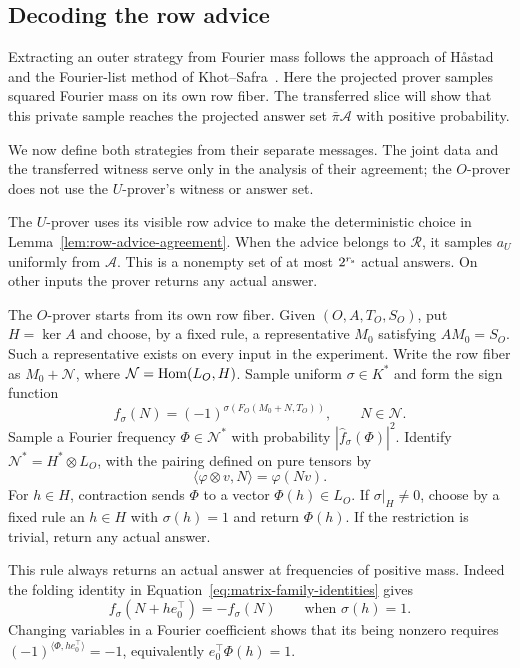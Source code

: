 \subsection{Decoding the row advice}

Extracting an outer strategy from Fourier mass follows the approach of
H\aa stad~\cite[Section~1.1]{Hastad01} and the Fourier-list method of
Khot--Safra~\cite[Section~1.1]{KS13}. Here the projected prover samples
squared Fourier mass on its own row fiber.  The transferred slice will
show that this private sample reaches the projected answer set
$\bar\pi\mathcal A$ with positive probability.

We now define both strategies from their separate messages.  The joint
data and the transferred witness serve only in the analysis of their
agreement; the $O$-prover does not use the $U$-prover's witness or answer set.

The $U$-prover uses its visible row advice to make the deterministic choice
in Lemma~\ref{lem:row-advice-agreement}.  When the advice belongs to $\mathcal R$, it samples
$a_U$ uniformly from $\mathcal A$.
This is a nonempty set of at most $2^{r_{\rm s}}$ actual answers.  On
other inputs the prover returns any actual answer.

The $O$-prover starts from its own row fiber.  Given $(O,A,T_O,S_O)$, put
$H=\ker A$ and choose, by a fixed rule, a representative $M_0$ satisfying
$AM_0=S_O$.  Such a representative exists
on every input in the experiment.  Write the row fiber as $M_0+\mathcal N$, where
$\mathcal N=\operatorname{Hom}(L_O,H)$.  Sample uniform $\sigma\in K^*$ and form the sign
function
\[
 f_\sigma(N)=(-1)^{\sigma(F_O(M_0+N,T_O))},\qquad N\in \mathcal N.
\]
Sample a Fourier frequency $\Phi\in \mathcal N^*$ with probability
$|\widehat f_\sigma(\Phi)|^2$.  Identify
$\mathcal N^*=H^*\otimes L_O$, with the pairing defined on pure tensors by
\[
 \langle\varphi\otimes v,N\rangle=\varphi(Nv).
\]
For $h\in H$, contraction sends $\Phi$ to a vector $\Phi(h)\in L_O$.
If $\sigma|_H\ne0$, choose by a fixed rule an $h\in H$ with $\sigma(h)=1$ and
return $\Phi(h)$.  If the restriction is trivial, return any actual
answer.

This rule always returns an actual answer at frequencies of positive
mass.  Indeed the folding identity in
Equation~\eqref{eq:matrix-family-identities} gives
\[
 f_\sigma(N+h e_0^\top)=-f_\sigma(N)
 \qquad\text{when }\sigma(h)=1.
\]
Changing variables in a Fourier coefficient shows that its being nonzero
requires
$(-1)^{\langle\Phi,h e_0^\top\rangle}=-1$, equivalently
$e_0^\top\Phi(h)=1$.

